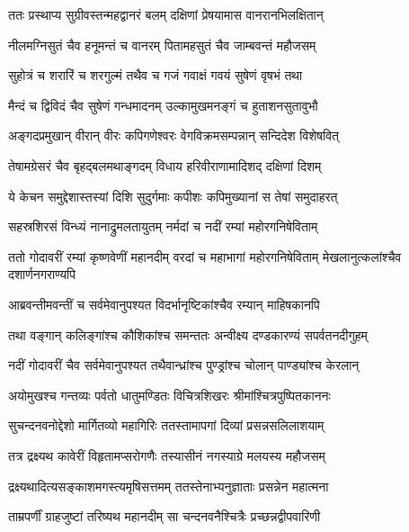 
\twolineshloka
{ततः प्रस्थाप्य सुग्रीवस्तन्महद्वानरं बलम्}
{दक्षिणां प्रेषयामास वानरानभिलक्षितान्} %

\twolineshloka
{नीलमग्निसुतं चैव हनूमन्तं च वानरम्}
{पितामहसुतं चैव जाम्बवन्तं महौजसम्} %

\twolineshloka
{सुहोत्रं च शरारिं च शरगुल्मं तथैव च}
{गजं गवाक्षं गवयं सुषेणं वृषभं तथा} %

\twolineshloka
{मैन्दं च द्विविदं चैव सुषेणं गन्धमादनम्}
{उल्कामुखमनङ्गं च हुताशनसुतावुभौ} %

\twolineshloka
{अङ्गदप्रमुखान् वीरान् वीरः कपिगणेश्वरः}
{वेगविक्रमसम्पन्नान् सन्दिदेश विशेषवित्} %

\twolineshloka
{तेषामग्रेसरं चैव बृहद्बलमथाङ्गदम्}
{विधाय हरिवीराणामादिशद् दक्षिणां दिशम्} %

\twolineshloka
{ये केचन समुद्देशास्तस्यां दिशि सुदुर्गमाः}
{कपीशः कपिमुख्यानां स तेषां समुदाहरत्} %

\twolineshloka
{सहस्रशिरसं विन्ध्यं नानाद्रुमलतायुतम्}
{नर्मदां च नदीं रम्यां महोरगनिषेविताम्} %

\threelineshloka
{ततो गोदावरीं रम्यां कृष्णवेणीं महानदीम्}
{वरदां च महाभागां महोरगनिषेविताम्}
{मेखलानुत्कलांश्चैव दशार्णनगराण्यपि} %

\twolineshloka
{आब्रवन्तीमवन्तीं च सर्वमेवानुपश्यत}
{विदर्भानृष्टिकांश्चैव रम्यान् माहिषकानपि} %

\twolineshloka
{तथा वङ्गान् कलिङ्गांश्च कौशिकांश्च समन्ततः}
{अन्वीक्ष्य दण्डकारण्यं सपर्वतनदीगुहम्} %

\twolineshloka
{नदीं गोदावरीं चैव सर्वमेवानुपश्यत}
{तथैवान्ध्रांश्च पुण्ड्रांश्च चोलान् पाण्ड्यांश्च केरलान्} %

\twolineshloka
{अयोमुखश्च गन्तव्यः पर्वतो धातुमण्डितः}
{विचित्रशिखरः श्रीमांश्चित्रपुष्पितकाननः} %

\twolineshloka
{सुचन्दनवनोद्देशो मार्गितव्यो महागिरिः}
{ततस्तामापगां दिव्यां प्रसन्नसलिलाशयाम्} %

\twolineshloka
{तत्र द्रक्ष्यथ कावेरीं विहृतामप्सरोगणैः}
{तस्यासीनं नगस्याग्रे मलयस्य महौजसम्} %

\twolineshloka
{द्रक्ष्यथादित्यसङ्काशमगस्त्यमृषिसत्तमम्}
{ततस्तेनाभ्यनुज्ञाताः प्रसन्नेन महात्मना} %

\twolineshloka
{ताम्रपर्णीं ग्राहजुष्टां तरिष्यथ महानदीम्}
{सा चन्दनवनैश्चित्रैः प्रच्छन्नद्वीपवारिणी} %


